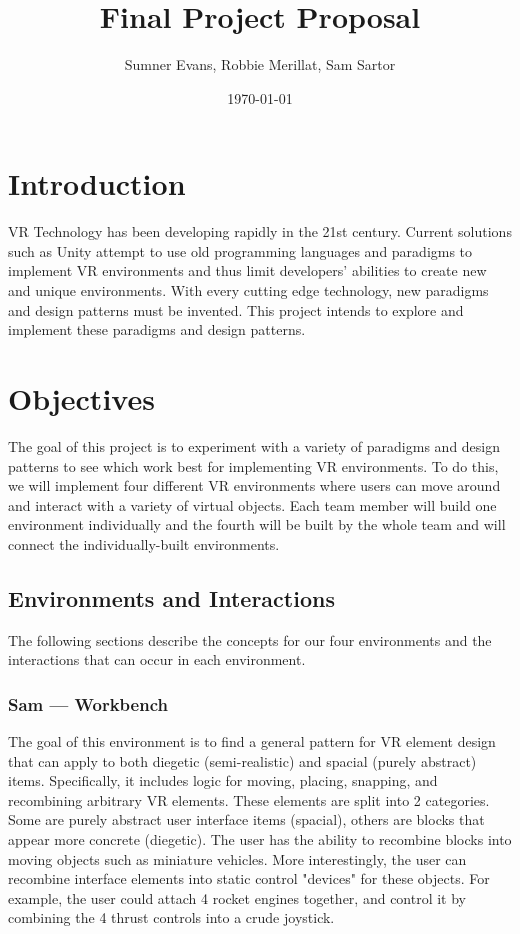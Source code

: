 \documentclass[titlepage,12pt]{article}
\title{Final Project Proposal}
\author{Sumner Evans, Robbie Merillat, Sam Sartor}
\date{\today}
\begin{document}
\maketitle

\section{Introduction}

VR Technology has been developing rapidly in the 21st century. Current solutions
such as Unity attempt to use old programming languages and paradigms to
implement VR environments and thus limit developers' abilities to create new and
unique environments. With every cutting edge technology, new paradigms and
design patterns must be invented. This project intends to explore and implement
these paradigms and design patterns.

\section{Objectives}

The goal of this project is to experiment with a variety of paradigms and design
patterns to see which work best for implementing VR environments. To do this, we
will implement four different VR environments where users can move around and
interact with a variety of virtual objects. Each team member will build one
environment individually and the fourth will be built by the whole team and will
connect the individually-built environments.

\subsection{Environments and Interactions}
The following sections describe the concepts for our four environments and the
interactions that can occur in each environment.


\subsubsection{Sam --- Workbench} 
The goal of this environment is to find a general pattern for VR element design
that can apply to both diegetic (semi-realistic) and spacial (purely abstract)
items. Specifically, it includes logic for moving, placing, snapping, and
recombining arbitrary VR elements. These elements are split into 2 categories.
Some are purely abstract user interface items (spacial), others are blocks that
appear more concrete (diegetic). The user has the ability to recombine blocks
into moving objects such as miniature vehicles. More interestingly, the user can
recombine interface elements into static control "devices" for these objects.
For example, the user could attach 4 rocket engines together, and control it by
combining the 4 thrust controls into a crude joystick.
\end{document}
